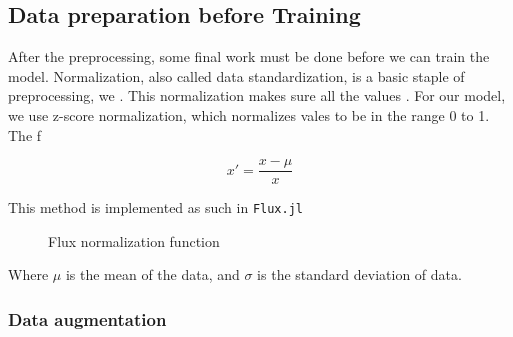 \subsection{Data preparation before Training} 

After the preprocessing, some final work must be done before we can train the model. Normalization, also called data standardization, 
is a basic staple of preprocessing, we  . This normalization makes sure all the values . For our model, we use z-score normalization, 
which normalizes vales to be in the range 0 to 1. The f

\begin{equation}
    x' = \frac{x - \mu}{x}
\end{equation}

This method is implemented as such in \texttt{Flux.jl}

\begin{figure}[h]
    \centering
    
    \caption{Flux normalization function}
    \label{fig:normalize_data}
\end{figure}

Where $\mu$ is the mean of the data, and $\sigma$ is the standard deviation of data.

\subsubsection{Data augmentation}
